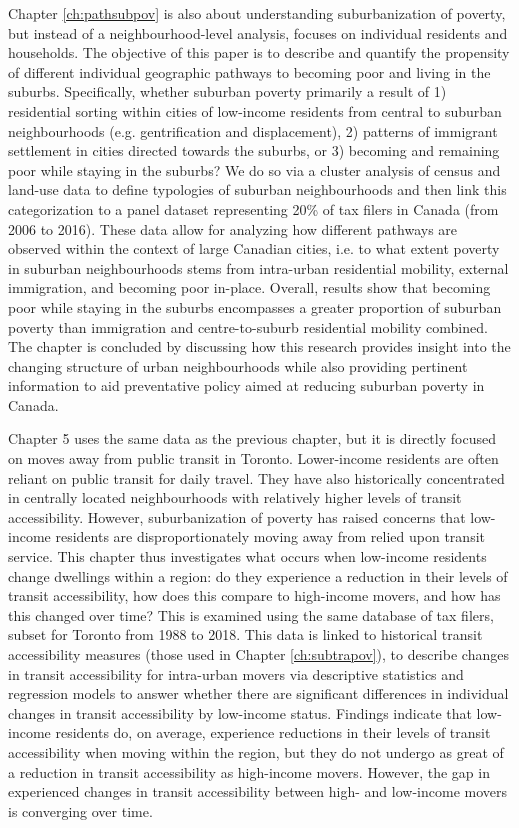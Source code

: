 Chapter \ref{ch:pathsubpov} is also about understanding suburbanization of poverty, but instead of a neighbourhood-level analysis, focuses on individual residents and households. The objective of this paper is to describe and quantify the propensity of different individual geographic pathways to becoming poor and living in the suburbs. Specifically, whether suburban poverty primarily a result of 1) residential sorting within cities of low-income residents from central to suburban neighbourhoods (e.g. gentrification and displacement), 2) patterns of immigrant settlement in cities directed towards the suburbs, or 3) becoming and remaining poor while staying in the suburbs?  We do so via a cluster analysis of census and land-use data to define typologies of suburban neighbourhoods and then link this categorization to a panel dataset representing 20\% of tax filers in Canada (from 2006 to 2016). These data allow for analyzing how different pathways are observed within the context of large Canadian cities, i.e. to what extent poverty in suburban neighbourhoods stems from intra-urban residential mobility, external immigration, and becoming poor in-place. Overall, results show that becoming poor while staying in the suburbs encompasses a greater proportion of suburban poverty than immigration and centre-to-suburb residential mobility combined. The chapter is concluded by discussing how this research provides insight into the changing structure of urban neighbourhoods while also providing pertinent information to aid preventative policy aimed at reducing suburban poverty in Canada.

Chapter 5 uses the same data as the previous chapter, but it is directly focused on moves away from public transit in Toronto. Lower-income residents are often reliant on public transit for daily travel. They have also historically concentrated in centrally located neighbourhoods with relatively higher levels of transit accessibility. However, suburbanization of poverty has raised concerns that low-income residents are disproportionately moving away from relied upon transit service. This chapter thus investigates what occurs when low-income residents change dwellings within a region: do they experience a reduction in their levels of transit accessibility, how does this compare to high-income movers, and how has this changed over time? This is examined using the same database of tax filers, subset for Toronto from 1988 to 2018. This data is linked to historical transit accessibility measures (those used in Chapter \ref{ch:subtrapov}), to describe changes in transit accessibility for intra-urban movers via descriptive statistics and regression models to answer whether there are significant differences in individual changes in transit accessibility by low-income status. Findings indicate that low-income residents do, on average, experience reductions in their levels of transit accessibility when moving within the region, but they do not undergo as great of a reduction in transit accessibility as high-income movers. However, the gap in experienced changes in transit accessibility between high- and low-income movers is converging over time.

